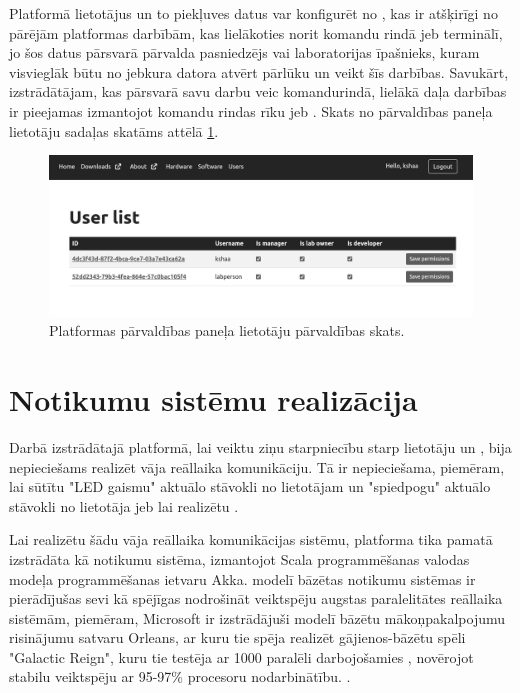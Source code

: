 Platformā lietotājus un to piekļuves datus var konfigurēt no
, kas ir atšķirīgi no pārējām platformas
darbībām, kas lielākoties norit komandu rindā jeb terminālī, jo šos datus
pārsvarā pārvalda pasniedzējs vai laboratorijas īpašnieks, kuram visvieglāk būtu
no jebkura datora atvērt pārlūku un veikt šīs darbības. Savukārt, izstrādātājam,
kas pārsvarā savu darbu veic komandurindā, lielākā daļa darbības ir pieejamas
izmantojot komandu rindas rīku jeb . Skats no
pārvaldības paneļa lietotāju sadaļas skatāms attēlā \ref{fig:mgmtpanelusr}.

\begin{figure}[H]
    \includegraphics[width=0.9\linewidth]{assets/mgmt-panel-usr-gray.png}
    \centering
    \caption{Platformas pārvaldības paneļa lietotāju pārvaldības skats.}
    \label{fig:mgmtpanelusr}
\end{figure}

\section{Notikumu sistēmu realizācija}
\label{sec:dipactorsystem}

Darbā izstrādātajā platformā, lai veiktu ziņu starpniecību starp lietotāju un
, bija nepieciešams realizēt vāja reāllaika
komunikāciju. Tā ir nepieciešama, piemēram, lai sūtītu "LED gaismu" aktuālo
stāvokli no  lietotājam un "spiedpogu" aktuālo
stāvokli no lietotāja  jeb lai realizētu
.

Lai realizētu šādu vāja reāllaika komunikācijas sistēmu, platforma tika pamatā
izstrādāta kā notikumu sistēma, izmantojot Scala programmēšanas valodas
 modeļa programmēšanas ietvaru Akka.
 modelī bāzētas notikumu sistēmas ir pierādījušas sevi
kā spējīgas nodrošināt veiktspēju augstas paralelitātes reāllaika sistēmām,
piemēram, Microsoft ir izstrādājuši  modelī bāzētu
mākoņpakalpojumu risinājumu satvaru Orleans, ar kuru tie spēja realizēt
gājienos-bāzētu spēli "Galactic Reign", kuru tie testēja ar 1000 paralēli
darbojošamies , novērojot stabilu veiktspēju ar
95-97\% procesoru nodarbinātību. \cite[para. 5.1, 5.2]{Bernstein2014}.

